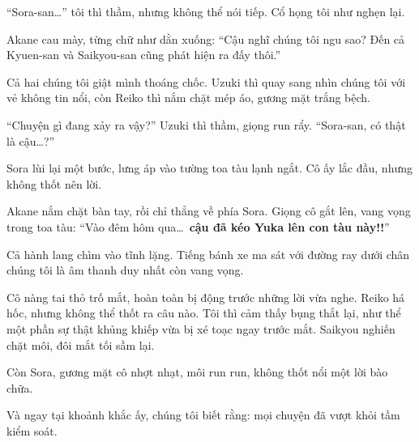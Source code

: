 \documentclass[../main.tex]{subfiles}
\begin{document}
``Sora-san\dots'' tôi thì thầm, nhưng không thể nói tiếp. Cổ họng tôi như nghẹn lại.

Akane cau mày, từng chữ như dằn xuống: ``Cậu nghĩ chúng tôi ngu sao? Đến cả Kyuen-san và Saikyou-san cũng phát hiện ra đấy thôi.''

Cả hai chúng tôi giật mình thoáng chốc. Uzuki thì quay sang nhìn chúng tôi với vẻ không tin nổi, còn Reiko thì nắm chặt mép áo, gương mặt trắng bệch.

``Chuyện gì đang xảy ra vậy?'' Uzuki thì thầm, giọng run rẩy. ``Sora-san, có thật là cậu\dots?''

Sora lùi lại một bước, lưng áp vào tường toa tàu lạnh ngắt. Cô ấy lắc đầu, nhưng không thốt nên lời.

Akane nắm chặt bàn tay, rồi chỉ thẳng về phía Sora. Giọng cô gắt lên, vang vọng trong toa tàu:
``Vào đêm hôm qua\dots\ \textbf{cậu đã kéo Yuka lên con tàu này!!}''


Cả hành lang chìm vào tĩnh lặng. Tiếng bánh xe ma sát với đường ray dưới chân chúng tôi là âm thanh duy nhất còn vang vọng.

Cô nàng tai thỏ trố mắt, hoàn toàn bị động trước những lời vừa nghe. Reiko há hốc, nhưng không thể thốt ra câu nào. Tôi thì cảm thấy bụng thắt lại, như thể một phần sự thật khủng khiếp vừa bị xé toạc ngay trước mắt. Saikyou nghiến chặt môi, đôi mắt tối sầm lại.

Còn Sora, gương mặt cô nhợt nhạt, môi run run, không thốt nổi một lời bào chữa.

Và ngay tại khoảnh khắc ấy, chúng tôi biết rằng: mọi chuyện đã vượt khỏi tầm kiểm soát.
\end{document}
